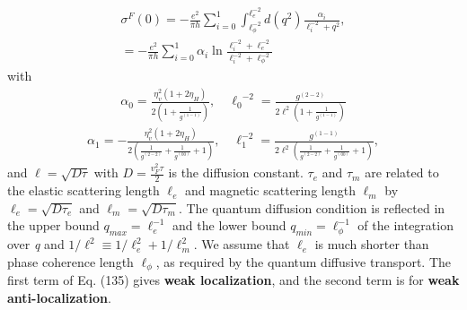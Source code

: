 \documentclass[aps,prb,amsmath,amssymb,footinbib,showpacs,twocolumn]{revtex4-2}
\begin{document}
\begin{widetext}
\begin{align}
     \sigma^{F}(0)= -\frac{e^{2}}{\pi h}\sum_{i= 0}^{1}\int_{\ell^{-2}_{\phi}}^{\ell^{-2}_{e}}d(q^{2})\frac{\alpha_{i}}{\ell^{-2}_{i}+q^{2}}, \\
    = -\frac{e^{2}}{\pi h}\sum_{i= 0}^{1}\alpha_{i} \ln\frac{\ell^{-2}_{i}+\ell^{-2}_{e}}{\ell^{-2}_{i}+\ell^{-2}_{\phi}}
\end{align}
with
\begin{align}
      \alpha_{0}= \frac{\eta^{2}_{v}(1+2\eta_{H})}{2(1+\frac{1}{g^{(1-1)}})}, \quad {\ell_{0}}^{-2} = \frac{g^{(2-2)}}{2\ell^{2}(1+\frac{1}{g^{(1-1)}})} 
\end{align}
\begin{align}
     \alpha_{1}= -\frac{\eta^{2}_{v}(1+2\eta_{H})}{2(\frac{1}{g^{(2-2)}}+\frac{1}{g^{(00)}}+1)}, \quad \ell^{-2}_{1} = \frac{g^{(1-1)}}{2\ell^{2}(\frac{1}{g^{(2-2)}}+\frac{1}{g^{(00)}}+1)},
\end{align}
and $\ell=\sqrt{D\tau}$ with $D=\frac{v^{2}_{F}\tau}{2}$ is the diffusion constant. $\tau_{e}$ and  $\tau_{m}$ are related to the elastic scattering length $\ell_{e}$ and magnetic scattering length $\ell_{m}$ by $\ell_{e}=\sqrt{D\tau_{e}}$ and $\ell_{m}=\sqrt{D\tau_{m}}$. The quantum diffusion condition is reflected in the upper bound ${q_{max}=\ell^{-1}_e}$ and the lower bound ${q_{min}=\ell^{-1}_\phi}$ of the integration over \textit{q} and $1/\ell^{2} \equiv 1/\ell^{2}_{e}+1/\ell^{2}_{m}$. We assume that $\ell_{e}$ is much shorter than phase coherence length $\ell_{\phi}$, as required by the quantum diffusive transport. The first term of Eq. (135) gives \textbf{weak localization}, and the second term is for \textbf{weak anti-localization}.

\end{widetext}
\end{document}

